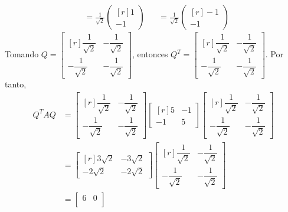 \begin{example}
\begin{align*}
        & = \frac{1}{\sqrt{2}} \begin{pmatrix*}[r] 1 \\ -1 \end{pmatrix*} & & = \frac{1}{\sqrt{2}} \begin{pmatrix*}[r] -1 \\ -1 \end{pmatrix*}
    \end{align*}
    Tomando $Q = \begin{bmatrix*}[r]
        \dfrac{1}{\sqrt{2}} & - \dfrac{1}{\sqrt{2}} \\[3mm]
        -\dfrac{1}{\sqrt{2}} & -\dfrac{1}{\sqrt{2}}
    \end{bmatrix*}$, entonces $Q^T = \begin{bmatrix*}[r]
        \dfrac{1}{\sqrt{2}} & - \dfrac{1}{\sqrt{2}} \\[3mm]
        -\dfrac{1}{\sqrt{2}} & -\dfrac{1}{\sqrt{2}}
    \end{bmatrix*}$. Por tanto,
    \begin{align*}
        Q^TAQ & = \begin{bmatrix*}[r]
            \dfrac{1}{\sqrt{2}} & - \dfrac{1}{\sqrt{2}} \\[3mm]
            -\dfrac{1}{\sqrt{2}} & -\dfrac{1}{\sqrt{2}}
        \end{bmatrix*} \begin{bmatrix*}[r]
            5 & -1 \\
            -1 & 5
        \end{bmatrix*} \begin{bmatrix*}[r]
            \dfrac{1}{\sqrt{2}} & - \dfrac{1}{\sqrt{2}} \\[3mm]
            -\dfrac{1}{\sqrt{2}} & -\dfrac{1}{\sqrt{2}}
        \end{bmatrix*} \\
        & = \begin{bmatrix*}[r]
            3\sqrt{2} & -3\sqrt{2} \\
            -2\sqrt{2} & -2\sqrt{2}
        \end{bmatrix*} \begin{bmatrix*}[r]
            \dfrac{1}{\sqrt{2}} & - \dfrac{1}{\sqrt{2}} \\[3mm]
            -\dfrac{1}{\sqrt{2}} & -\dfrac{1}{\sqrt{2}}
        \end{bmatrix*} \\
        & = \begin{bmatrix}
            6 & 0 \\

\end{bmatrix}
\end{align*}
\end{example}
